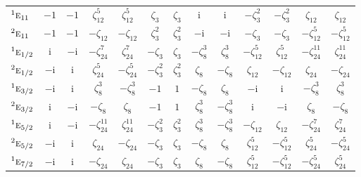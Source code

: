 \documentclass[10pt,a4paper]{article}
\makeatletter
\def\grouprule#1#2{\noalign{\marks\LTgroupmarks{\the\belowrulesep}\nobreak\vskip#1%
  \vskip\aboverulesep}\multispan\LT@cols\unskip{\leaders\hrule\@height#2\hfill\kern\z@}\cr
  \noalign{\penalty\LTrulebreak\vskip\belowrulesep\global\@lastruleclass\z@}}
\numberwithin{equation}{section}
\newcommand{\irr}[1]{\text{\normalfont\scshape #1}}
\newcommand{\conjpair}[1]{{}^{#1}}
\newcommand{\iunit}{\mathrm{i}}
\newcommand{\rootunity}[1]{\zeta_{#1}}
\makeatother
\begin{document}
{\begin{longtable}{@{}lcccccccccccc@{}}
$\conjpair{1}\irr{e}_{11}$ & $-1$ & $-1$ & $\rootunity{12}^{5}$ & $\rootunity{12}^{5}$ & $\rootunity{3}$ & $\rootunity{3}$ & $\iunit{}$ & $\iunit{}$ & $-\rootunity{3}^{2}$ & $-\rootunity{3}^{2}$ & $\rootunity{12}$ & $\rootunity{12}$\\
$\conjpair{2}\irr{e}_{11}$ & $-1$ & $-1$ & $-\rootunity{12}$ & $-\rootunity{12}$ & $\rootunity{3}^{2}$ & $\rootunity{3}^{2}$ & $-\iunit{}$ & $-\iunit{}$ & $-\rootunity{3}$ & $-\rootunity{3}$ & $-\rootunity{12}^{5}$ & $-\rootunity{12}^{5}$\\
\grouprule{0pt}{\lightrulewidth}
$\conjpair{1}\irr{e}_{1/2}$ & $\iunit{}$ & $-\iunit{}$ & $-\rootunity{24}^{7}$ & $\rootunity{24}^{7}$ & $-\rootunity{3}$ & $\rootunity{3}$ & $-\rootunity{8}^{3}$ & $\rootunity{8}^{3}$ & $-\rootunity{12}^{5}$ & $\rootunity{12}^{5}$ & $-\rootunity{24}^{11}$ & $\rootunity{24}^{11}$\\
$\conjpair{2}\irr{e}_{1/2}$ & $-\iunit{}$ & $\iunit{}$ & $\rootunity{24}^{5}$ & $-\rootunity{24}^{5}$ & $-\rootunity{3}^{2}$ & $\rootunity{3}^{2}$ & $\rootunity{8}$ & $-\rootunity{8}$ & $\rootunity{12}$ & $-\rootunity{12}$ & $\rootunity{24}$ & $-\rootunity{24}$\\
$\conjpair{1}\irr{e}_{3/2}$ & $-\iunit{}$ & $\iunit{}$ & $\rootunity{8}^{3}$ & $-\rootunity{8}^{3}$ & $-1$ & $1$ & $-\rootunity{8}$ & $\rootunity{8}$ & $-\iunit{}$ & $\iunit{}$ & $-\rootunity{8}^{3}$ & $\rootunity{8}^{3}$\\
$\conjpair{2}\irr{e}_{3/2}$ & $\iunit{}$ & $-\iunit{}$ & $-\rootunity{8}$ & $\rootunity{8}$ & $-1$ & $1$ & $\rootunity{8}^{3}$ & $-\rootunity{8}^{3}$ & $\iunit{}$ & $-\iunit{}$ & $\rootunity{8}$ & $-\rootunity{8}$\\
$\conjpair{1}\irr{e}_{5/2}$ & $\iunit{}$ & $-\iunit{}$ & $-\rootunity{24}^{11}$ & $\rootunity{24}^{11}$ & $-\rootunity{3}^{2}$ & $\rootunity{3}^{2}$ & $\rootunity{8}^{3}$ & $-\rootunity{8}^{3}$ & $-\rootunity{12}$ & $\rootunity{12}$ & $-\rootunity{24}^{7}$ & $\rootunity{24}^{7}$\\
$\conjpair{2}\irr{e}_{5/2}$ & $-\iunit{}$ & $\iunit{}$ & $\rootunity{24}$ & $-\rootunity{24}$ & $-\rootunity{3}$ & $\rootunity{3}$ & $-\rootunity{8}$ & $\rootunity{8}$ & $\rootunity{12}^{5}$ & $-\rootunity{12}^{5}$ & $\rootunity{24}^{5}$ & $-\rootunity{24}^{5}$\\
$\conjpair{1}\irr{e}_{7/2}$ & $-\iunit{}$ & $\iunit{}$ & $-\rootunity{24}$ & $\rootunity{24}$ & $-\rootunity{3}$ & $\rootunity{3}$ & $\rootunity{8}$ & $-\rootunity{8}$ & $\rootunity{12}^{5}$ & $-\rootunity{12}^{5}$ & $-\rootunity{24}^{5}$ & $\rootunity{24}^{5}$\\

\end{longtable}}
\end{document}
